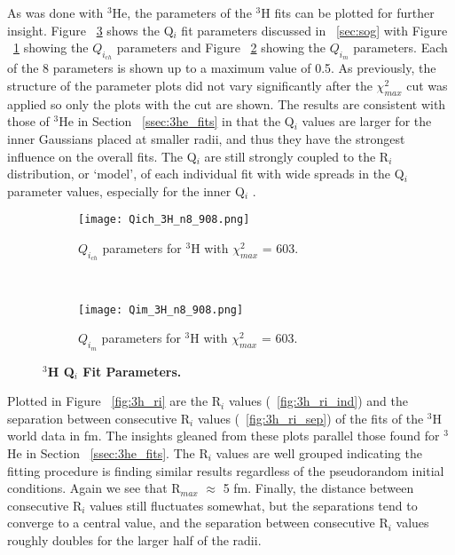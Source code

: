 As was done with $^3$He, the parameters of the $^3$H fits can be plotted for further insight. Figure ~\ref{fig:3h_qi} shows the Q$_i$ fit parameters discussed in ~\ref{sec:sog} with Figure ~\ref{fig:3h_qch} showing the $Q_{i_{ch}}$ parameters and Figure ~\ref{fig:3h_qm} showing the $Q_{i_{m}}$ parameters. Each of the 8 parameters is shown up to a maximum value of 0.5. As previously, the structure of the parameter plots did not vary significantly after the $\chi^2_{max}$ cut was applied so only the plots with the cut are shown. The results are consistent with those of $^3$He in Section ~\ref{ssec:3he_fits} in that the Q$_i$ values are larger for the inner Gaussians placed at smaller radii, and thus they have the strongest influence on the overall fits. The Q$_i$ are still strongly coupled to the R$_i$ distribution, or `model', of each individual fit with wide spreads in the Q$_i$ parameter values, especially for the inner Q$_i$ .

\begin{figure}[!ht]
\begin{subfigure}{1.\textwidth}
  \centering
  \texttt{[image: Qich\_3H\_n8\_908.png]}
  \caption{$Q_{i_{ch}}$ parameters for $^3$H with $\chi^2_{max}$ = 603.}
  \label{fig:3h_qch}
\end{subfigure}\\
\begin{subfigure}{1.\textwidth}
  \centering
  \texttt{[image: Qim\_3H\_n8\_908.png]}
  \caption{$Q_{i_{m}}$ parameters for $^3$H with $\chi^2_{max}$ = 603.}
  \label{fig:3h_qm}
\end{subfigure}
\caption{\bf{$^3$H Q$_i$ Fit Parameters.}}
\label{fig:3h_qi}
\end{figure}

Plotted in Figure ~\ref{fig:3h_ri} are the R$_i$ values (~\ref{fig:3h_ri_ind}) and the separation between consecutive R$_i$ values (~\ref{fig:3h_ri_sep}) of the fits of the $^3$H world data in fm. The insights gleaned from these plots parallel those found for $^3$He in Section ~\ref{ssec:3he_fits}. The R$_i$ values are well grouped indicating the fitting procedure is finding similar results regardless of the pseudorandom initial conditions. Again we see that  R$_{max}$ $\approx$ 5 fm. Finally, the distance between consecutive R$_i$ values still fluctuates somewhat, but the separations tend to converge to a central value, and the separation between consecutive R$_i$ values roughly doubles for the larger half of the radii.

